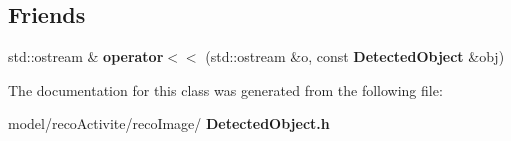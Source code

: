 \subsection*{Friends}
\begin{DoxyCompactItemize}
\item 
\mbox{\label{class_detected_object_a1db38dd0a9d22af8fbc737d50ee9bfe7}} 
std\+::ostream \& {\bfseries operator$<$$<$} (std\+::ostream \&o, const \textbf{ Detected\+Object} \&obj)
\end{DoxyCompactItemize}


The documentation for this class was generated from the following file\+:\begin{DoxyCompactItemize}
\item 
model/reco\+Activite/reco\+Image/\textbf{ Detected\+Object.\+h}\end{DoxyCompactItemize}
